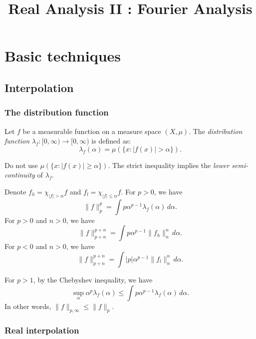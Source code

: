 \documentclass{../crs}
\title{Real Analysis II : Fourier Analysis}
\begin{document}
\maketitle
\tableofcontents

\chapter{Basic techniques}




\section{Interpolation}



\subsection{The distribution function}
\begin{defn}
Let $f$ be a measurable function on a measure space $(X,\mu)$.
The \emph{distribution function} $\lambda_f:[0,\infty)\to [0,\infty)$ is defined as:
\[\lambda_f(\alpha)=\mu(\{x:|f(x)|>\alpha\}).\]
\end{defn}


Do not use $\mu(\{x:|f(x)|\ge\alpha\})$.
The strict inequality implies the \emph{lower semi-continuity} of $\lambda_f$.

\begin{thm}[Fubini]
Denote $f_h=\chi_{|f|>\alpha}f$ and $f_l=\chi_{|f|\le\alpha}f$.
For $p>0$, we have
\[\|f\|_p^p=\int p\alpha^{p-1}\lambda_f(\alpha)\,d\alpha.\]
For $p>0$ and $n>0$, we have
\[\|f\|_{p+n}^{p+n}=\int p\alpha^{p-1}\|f_h\|_n^n\,d\alpha.\]
For $p<0$ and $n>0$, we have
\[\|f\|_{p+n}^{p+n}=\int |p|\alpha^{p-1}\|f_l\|_n^n\,d\alpha.\]
\end{thm}
\begin{thm}
For $p>1$, by the Chebyshev inequality, we have
\[\sup_\alpha\alpha^p\lambda_f(\alpha)\le\int p\alpha^{p-1}\lambda_f(\alpha)\,d\alpha.\]
In other words, $\|f\|_{p,\infty}\le\|f\|_p$.
\end{thm}





\subsection{Real interpolation}
\end{document}
